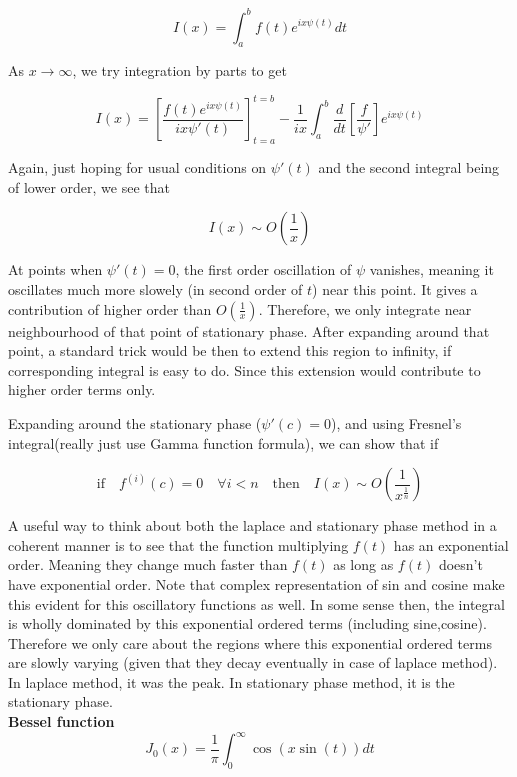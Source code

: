\documentclass{report}
\begin{document}
$$I(x) = \int_{a}^{b}f(t)e^{ix\psi(t)}dt$$

\noindent As $x\to\infty$, we try integration by parts to get


$$I(x) = \left[\frac{f(t)e^{ix\psi(t)}}{ix\psi'(t)}\right]_{t=a}^{t=b} - \frac{1}{ix}\int_{a}^{b}\frac{d}{dt}\left[\frac{f}{\psi'}\right]e^{ix\psi(t)}$$

\noindent Again, just hoping for usual conditions on $\psi'(t)$ and the second integral being of lower order, we see that 

$$I(x) \sim O\left(\frac{1}{x}\right)$$

\noindent At points when $\psi'(t) = 0$, the first order oscillation of $\psi$ vanishes, meaning it oscillates much more slowely (in second order of $t$) near this point. It gives a contribution of higher order than $O(\frac{1}{x})$. Therefore, we only integrate near neighbourhood of that point of stationary phase. After expanding around that point, a standard trick would be then to extend this region to infinity, if corresponding integral is easy to do. Since this extension would contribute to higher order terms only.

\noindent Expanding around the stationary phase ($\psi'(c) =0 $), and using Fresnel's integral(really just use Gamma function formula), we can show that if 

$$\mathrm{if}\quad f^{(i)}(c) = 0 \quad\forall i<n \quad \mathrm{then} \quad  I(x) \sim O\left(\frac{1}{x^{\frac{1}{n}}}\right)$$

\noindent A useful way to think about both the laplace and stationary phase method in a coherent manner is to see that the function multiplying $f(t)$ has an exponential order. Meaning they change much faster than $f(t)$ as long as $f(t)$ doesn't have exponential order. Note that complex representation of sin and cosine make this evident for this oscillatory functions as well. In some sense then, the integral is wholly dominated by this exponential ordered terms (including sine,cosine). Therefore we only care about the regions where this exponential ordered terms are slowly varying (given that they decay eventually in case of laplace method). In laplace method, it was the peak. In stationary phase method, it is the stationary phase.\\

\noindent \textbf{Bessel function}\\

$$J_0(x) = \frac{1}{\pi}\int_{0}^{\infty}\cos(x\sin(t)) dt$$
\end{document}
